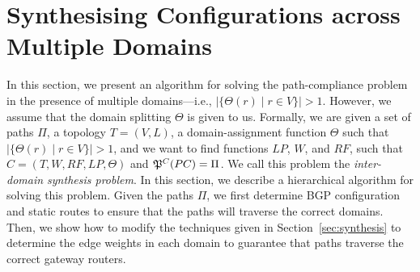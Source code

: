 \section{Synthesising Configurations across Multiple Domains}
\label{sec:synth-multi}

In this section, we present an algorithm for 
solving the path-compliance problem in the presence
of multiple domains---i.e., $|\{\Theta(r) \mid r\in V\}|>1$.
However, we assume that the domain splitting $\Theta$ is given to us.
Formally, we are given a set of paths $\Pi$,
a topology $T=(V,L)$,
a domain-assignment function $\Theta$ such that $|\{\Theta(r) \mid r\in V\}|>1$, 
and we want to find functions
$LP$, $W$, and $RF$,  such that
$C=(T,W,RF,LP,\Theta)$ and
$\mathfrak{P}^C(PC) = \Pi$.
We call this problem the \emph{inter-domain synthesis problem}.
In this section, we describe a hierarchical algorithm for solving this problem.
Given the paths $\Pi$, we first determine 
BGP configuration and static routes to ensure that the paths will traverse the correct
domains.
Then, we show how to modify the techniques given in Section~\ref{sec:synthesis}
to determine the edge weights in each domain to guarantee that paths traverse
the correct gateway routers.

\begin{figure}
	\centering
	\hfill
	\hfill
\end{figure}

